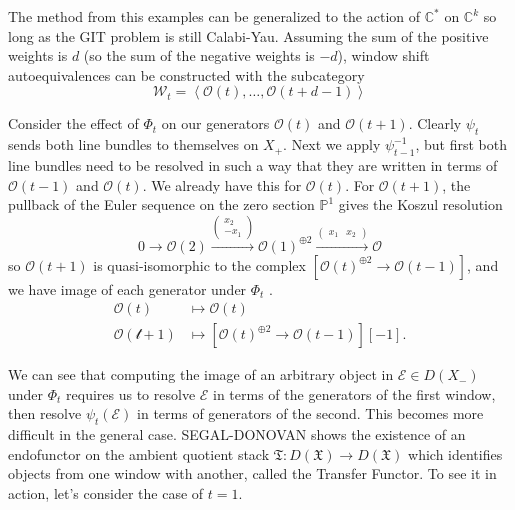 \begin{remark}{}{}
	The method from this examples can be generalized to the action of $\mathbb{C}^*$ on $\mathbb{C}^k$ so long as the GIT problem is still Calabi-Yau. Assuming the sum of the positive weights is $d$ (so the sum of the negative weights is $-d$), window shift autoequivalences can be constructed with the subcategory $$\mathcal{W}_{t}= \left< \mathcal{O}(t),\dots, \mathcal{O}(t+d-1) \right> $$
\end{remark}


Consider the effect of $\Phi_t$ on our generators $\mathcal{O}(t)$ and $\mathcal{O}(t+1)$. Clearly $\psi_t$ sends both line bundles to themselves on $X_{+}$. Next we apply $\psi_{t-1}^{-1}$, but first both line bundles need to be resolved in such a way that they are written in terms of $\mathcal{O}(t-1)$ and $\mathcal{O}(t)$. We already have this for $\mathcal{O}(t)$. For $\mathcal{O}(t+1)$, the pullback of the Euler sequence on the zero section $\mathbb{P}^1$ gives the Koszul resolution $$
 0\to \mathcal{O}(2)\xrightarrow{\begin{pmatrix}x_2\\-x_{1}\end{pmatrix}}\mathcal{O}(1)^{\oplus 2}\xrightarrow{\begin{pmatrix}x_{1}&x_2\end{pmatrix}} \mathcal{O}
$$so $\mathcal{O}(t+1)$ is quasi-isomorphic to the complex $\left[ \mathcal{O}(t)^{\oplus{2}}\to \mathcal{O}(t-1) \right]$, and we have image of each generator under $\Phi_t$ . 
\begin{align*}
\mathcal{O}(t) &\mapsto \mathcal{O}(t)\\
\mathcal{\mathcal{O}(t+1)}&\mapsto\left[ \mathcal{O}(t)^{\oplus 2}\to \mathcal{O}(t-1) \right][-1] .
\end{align*}

We can see that computing the image of an arbitrary object in $\mathcal{E} \in D(X_-)$ under $\Phi_t$ requires us to resolve $\mathcal{E}$ in terms of the generators of the first window, then resolve $\psi_{t}(\mathcal{E})$ in terms of generators of the second. This becomes more difficult in the general case.  SEGAL-DONOVAN shows the existence of an endofunctor on the ambient quotient stack $\mathfrak{T}: D(\mathfrak{X})\to D(\mathfrak{X})$ which identifies objects from one window with another, called the Transfer Functor. To see it in action, let's consider the case of $t = 1$.

